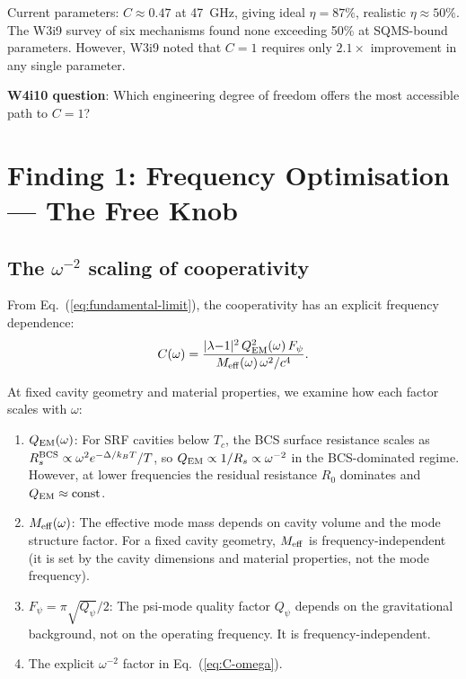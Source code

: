 \documentclass[11pt]{article}
\newcommand{\Meff}{M_{\rm eff}}
\newcommand{\lambdaone}{|\lambda{-}1|}
\newcommand{\Qpsi}{Q_\psi}
\newcommand{\QEM}{Q_{\rm EM}}
\newcommand{\Fpsi}{F_\psi}
\begin{document}
Current parameters: $C \approx 0.47$ at 47~GHz, giving ideal $\eta = 87\%$,
realistic $\eta \approx 50\%$. The W3i9 survey of six mechanisms found none
exceeding 50\% at SQMS-bound parameters. However, W3i9 noted that
$C = 1$ requires only $2.1\times$ improvement in any single parameter.

\textbf{W4i10 question}: Which engineering degree of freedom offers the most
accessible path to $C = 1$?

\section{Finding 1: Frequency Optimisation --- The Free Knob}
\label{sec:frequency}

\subsection{The $\omega^{-2}$ scaling of cooperativity}

From Eq.~(\ref{eq:fundamental-limit}), the cooperativity has an explicit
frequency dependence:
\begin{equation}
C(\omega) = \frac{\lambdaone^2\,\QEM^2(\omega)\,\Fpsi}
{\Meff(\omega)\,\omega^2/c^4}.
\label{eq:C-omega}
\end{equation}

At fixed cavity geometry and material properties, we examine how each
factor scales with $\omega$:

\begin{enumerate}
\item $\QEM(\omega)$: For SRF cavities below $T_c$, the BCS surface
  resistance scales as $R_s^{\rm BCS} \propto \omega^2 e^{-\Delta/k_BT}
  /T$, so $\QEM \propto 1/R_s \propto \omega^{-2}$ in the BCS-dominated
  regime. However, at lower frequencies the residual resistance $R_0$
  dominates and $\QEM \approx \text{const}$.

\item $\Meff(\omega)$: The effective mode mass depends on cavity volume
  and the mode structure factor. For a fixed cavity geometry, $\Meff$ is
  frequency-independent (it is set by the cavity dimensions and material
  properties, not the mode frequency).

\item $\Fpsi = \pi\sqrt{\Qpsi}/2$: The psi-mode quality factor $\Qpsi$
  depends on the gravitational background, not on the operating frequency.
  It is frequency-independent.

\item The explicit $\omega^{-2}$ factor in Eq.~(\ref{eq:C-omega}).
\end{enumerate}
\end{document}
